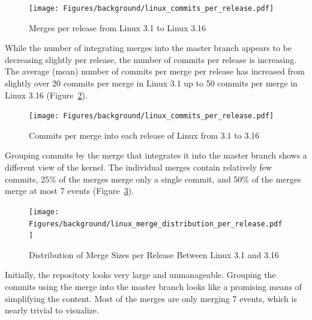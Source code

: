 \begin{figure}[htpb]
  \centering
  \texttt{[image: Figures/background/linux\_commits\_per\_release.pdf]}
  \caption{Merges per release from Linux 3.1 to Linux 3.16}
  \label{fig:linux_merges_per_release}
\end{figure}

While the number of integrating merges into the master branch appears to
be decreasing slightly per release, the number of commits per release is
increasing. The average (mean) number of commits per merge per release
has increased from slightly over 20 commits per merge in Linux 3.1 up to
50 commits per merge in Linux 3.16
(Figure~\ref{fig:linux_commits_per_merge_per_release}).

\begin{figure}[htpb]
  \centering
  \texttt{[image: Figures/background/linux\_commits\_per\_release.pdf]}
  \caption{Commits per merge into each release of Linux from 3.1 to 3.16
    }
  \label{fig:linux_commits_per_merge_per_release}
\end{figure}

Grouping commits by the merge that integrates it into the master branch
shows a different view of the kernel. The individual merges contain
relatively few commits, 25\% of the merges merge only a single commit,
and 50\% of the merges merge at most 7 events
(Figure~\ref{fig:linux_merge_distribution_per_release}).

\begin{figure}[htpb]
  \centering
  \texttt{[image: Figures/background/linux\_merge\_distribution\_per\_release.pdf]}
  \caption{Distribution of Merge Sizes per Release Between Linux 3.1 and
  3.16}
  \label{fig:linux_merge_distribution_per_release}
\end{figure}

Initially, the repository looks very large and unmanageable. Grouping
the commits using the merge into the master branch looks like a
promising means of simplifying the content. Most of the merges are only
merging 7 events, which is nearly trivial to visualize.
